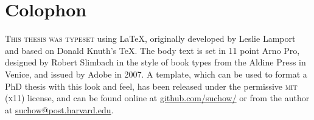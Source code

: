 \chapter*{Colophon}

\begin{center}
\parbox{200pt}{\raggedright\lettrine[lines=3,slope=-2pt,nindent=-4pt]{\textcolor{SchoolColor}{T}}{his thesis was typeset} using \LaTeX, originally developed by Leslie Lamport and based on Donald Knuth's \TeX. The body text is set in 11 point Arno Pro, designed by Robert Slimbach in the style of book types from the Aldine Press in Venice, and issued by Adobe in 2007. A template, which can be used to format a PhD thesis with this look and feel, has been released under the permissive \textsc{mit} (\textsc{x}11) license, and can be found online at \href{https://github.com/suchow/}{github.com/suchow/} or from the author at \href{mailto:suchow@fas.harvard.edu}{suchow@post.harvard.edu}.
}
\end{center}
